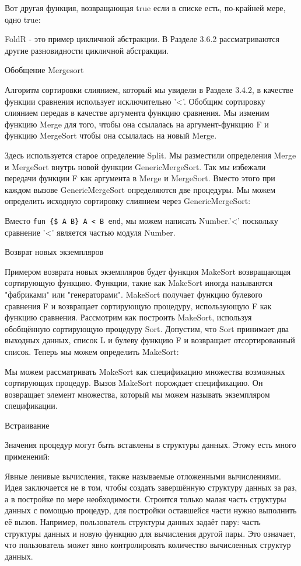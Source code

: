 Вот другая функция, возвращающая true если в списке есть, по-крайней мере, одно true:

FoldR - это пример цикличной абстракции. В Разделе 3.6.2 рассматриваются другие разновидности цикличной абстракции.

Обобщение Mergesort

Алгоритм сортировки слиянием, который мы увидели в Разделе 3.4.2, в качестве функции сравнения использует исключительно '<'. Обобщим сортировку слиянием передав в качестве аргумента функцию сравнения. Мы изменим функцию Merge для того, чтобы она ссылалась на аргумент-функцию F и функцию MergeSort чтобы она ссылалась на новый Merge.

Здесь используется старое определение Split. Мы разместили определения Merge и MergeSort внутрь новой функции GenericMergeSort. Так мы избежали передачи функции F как аргумента в Merge и MergeSort. Вместо этого при каждом вызове GenericMergeSort определяются две процедуры. Мы можем определить исходную сортировку слиянием через GenericMergeSort:

Вместо \verb!fun {$ A B} A < B end!, мы можем написать Number.'<' поскольку сравнение '<' является частью модуля Number.

Возврат новых экземпляров

Примером возврата новых экземпляров будет функция MakeSort возвращающая сортирующую функцию. Функции, такие как MakeSort иногда называются "фабриками" или "генераторами". MakeSort получает функцию булевого сравнения F и возвращает сортирующую процедуру, использующую F как функцию сравнения. Рассмотрим как построить MakeSort, используя обобщённую сортирующую процедуру Sort. Допустим, что Sort принимает два выходных данных, список L и булеву функцию F и возвращает отсортированный список. Теперь мы можем определить MakeSort:

Мы можем рассматривать MakeSort как спецификацию множества возможных сортирующих процедур. Вызов MakeSort порождает спецификацию. Он возвращает элемент множества, который мы можем называть экземпляром спецификации.

Встраивание

Значения процедур могут быть вставлены в структуры данных. Этому есть много применений:

Явные ленивые вычисления, также называемые отложенными вычислениями. Идея заключается не в том, чтобы создать завершённую структуру данных за раз, а в постройке по мере необходимости. Строится только малая часть структуры данных с помощью процедур, для постройки оставшейся части нужно выполнить её вызов. Например, пользователь структуры данных задаёт пару: часть структуры данных и новую функцию для вычисления другой пары. Это означает, что пользователь может явно контролировать количество вычисленных структур данных.

